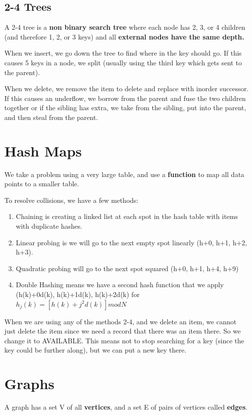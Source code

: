 \documentclass[12pt,letterpaper]{article} \usepackage{amsmath} \usepackage{graphicx} \usepackage[margin=1in]{geometry} \usepackage{longtable}  \usepackage{amssymb}
\begin{document}
	\subsection{2-4 Trees}
	A 2-4 tree is a\textbf{ non binary search tree} where each node has 2, 3, or 4 children (and therefore 1, 2, or 3 keys) and all \textbf{external nodes have the same depth. }
	
	When we insert, we go down the tree to find where in the key should go. If this causes 5 keys in a node, we split (usually using the third key which gets sent to the parent).
	
	When we delete, we remove the item to delete and replace with inorder successor. If this causes an underflow, we borrow from the parent and fuse the two children together or if the sibling has extra, we take from the sibling, put into the parent, and then steal from the parent. 
	
	\section{Hash Maps}
	We take a problem using a very large table, and use a \textbf{function} to map all data points to a smaller table. 
	
	To resolve collisions, we have a few methods:
	\begin{enumerate}[noitemsep]
		\item Chaining is creating a linked list at each spot in the hash table with items with duplicate hashes.
		\item Linear probing is we will go to the next empty spot linearly (h+0, h+1, h+2, h+3).
		\item Quadratic probing will go to the next spot squared (h+0, h+1, h+4, h+9)
		\item Double Hashing means we have a second hash function that we apply (h(k)+0d(k), h(k)+1d(k), h(k)+2d(k) for $h_j(k)=[h(k)+j^2d(k)]mod N$
	\end{enumerate}

	When we are using any of the methods 2-4, and we delete an item, we cannot just delete the item since we need a record that there was an item there. So we change it to AVAILABLE. This means not to stop searching for a key (since the key could be further along), but we can put a new key there.
	
	\section{Graphs}
	A graph has a set V of all \textbf{vertices}, and a set E of pairs of vertices called \textbf{edges}.
	
\end{document}
